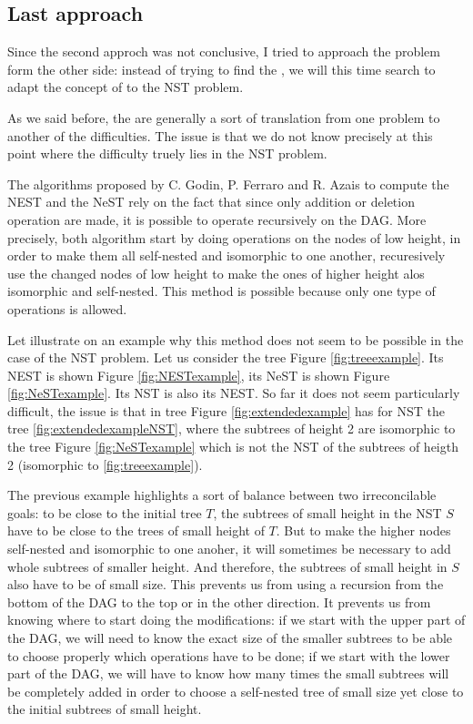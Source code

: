 \subsection{Last approach}

Since the second approch was not conclusive, I tried to approach the
problem form the other side: instead of trying to find the \widgets,
we will this time search to adapt the concept of \constraint to the
NST problem. 

As we said before, the \constraints are generally a sort of
translation from one problem to another of the difficulties. The issue
is that we do not know precisely at this point where the difficulty
truely lies in the NST problem. 

The algorithms proposed by C. Godin, P. Ferraro and R. Azais
\cite{godin, romain} to compute the NEST and the NeST rely on the fact
that since only addition or deletion operation are made, it is
possible to operate recursively on the DAG. More precisely, both
algorithm start by doing operations on the nodes of low height, in
order to make them all self-nested and isomorphic to one another,
recuresively use the changed nodes of low height to make the ones of
higher height alos isomorphic and self-nested. This method is possible
because only one type of operations is allowed.

Let illustrate on an example why this method does not seem to be
possible in the case of the NST problem. Let us consider the tree
Figure \ref{fig:treeexample}. Its NEST is shown Figure
\ref{fig:NESTexample}, its NeST is shown Figure \ref{fig:NeSTexample}.
Its NST is also its NEST. So far it does not seem particularly
difficult, the issue is that in tree Figure
\ref{fig:extendedexample} has for NST the tree
\ref{fig:extendedexampleNST}, where the subtrees of height 2 are
isomorphic to the tree Figure \ref{fig:NeSTexample} which is not the
NST of the subtrees of heigth 2 (isomorphic to \ref{fig:treeexample}).

The previous example highlights a sort of balance between two
irreconcilable goals: to be close to the initial tree $T$, the
subtrees of small height in the NST $S$ have to be close to the trees
of small height of $T$. But to make the higher nodes self-nested and
isomorphic to one anoher, it will sometimes be necessary to add whole
subtrees of smaller height. And therefore, the subtrees of small
height in $S$ also have to be of small size. This prevents us from
using a recursion from the bottom of the DAG to the top or in the
other direction. It prevents us from knowing where to start doing the
modifications: if we start with the upper part of the DAG, we will
need to know the exact size of the smaller subtrees to be able to
choose properly which operations have to be done; if we start with the
lower part of the DAG, we will have to know how many times the small
subtrees will be completely added in order to choose a self-nested
tree of small size yet close to the initial subtrees of small height.

